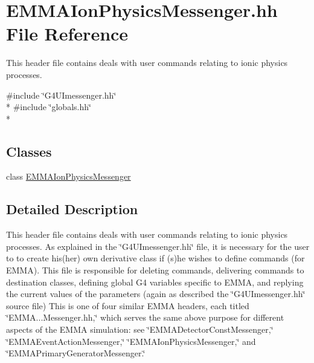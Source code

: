 \hypertarget{EMMAIonPhysicsMessenger_8hh}{\section{E\-M\-M\-A\-Ion\-Physics\-Messenger.\-hh File Reference}
\label{EMMAIonPhysicsMessenger_8hh}
}


This header file contains deals with user commands relating to ionic physics processes.  


{\ttfamily \#include \char`\"{}G4\-U\-Imessenger.\-hh\char`\"{}}\\*
{\ttfamily \#include \char`\"{}globals.\-hh\char`\"{}}\\*
\subsection*{Classes}
\begin{DoxyCompactItemize}
\item 
class \hyperlink{classEMMAIonPhysicsMessenger}{E\-M\-M\-A\-Ion\-Physics\-Messenger}
\end{DoxyCompactItemize}


\subsection{Detailed Description}
This header file contains deals with user commands relating to ionic physics processes. As explained in the \char`\"{}\-G4\-U\-Imessenger.\-hh\char`\"{} file, it is necessary for the user to to create his(her) own derivative class if (s)he wishes to define commands (for E\-M\-M\-A). This file is responsible for deleting commands, delivering commands to destination classes, defining global G4 variables specific to E\-M\-M\-A, and replying the current values of the parameters (again as described the \char`\"{}\-G4\-U\-Imessenger.\-hh\char`\"{} source file) This is one of four similar E\-M\-M\-A headers, each titled \char`\"{}\-E\-M\-M\-A...\-Messenger.\-hh,\char`\"{} which serves the same above purpose for different aspects of the E\-M\-M\-A simulation\-: see \char`\"{}\-E\-M\-M\-A\-Detector\-Const\-Messenger,\char`\"{} \char`\"{}\-E\-M\-M\-A\-Event\-Action\-Messenger,\char`\"{} \char`\"{}\-E\-M\-M\-A\-Ion\-Physics\-Messenger,\char`\"{} and \char`\"{}\-E\-M\-M\-A\-Primary\-Generator\-Messenger.\char`\"{} 